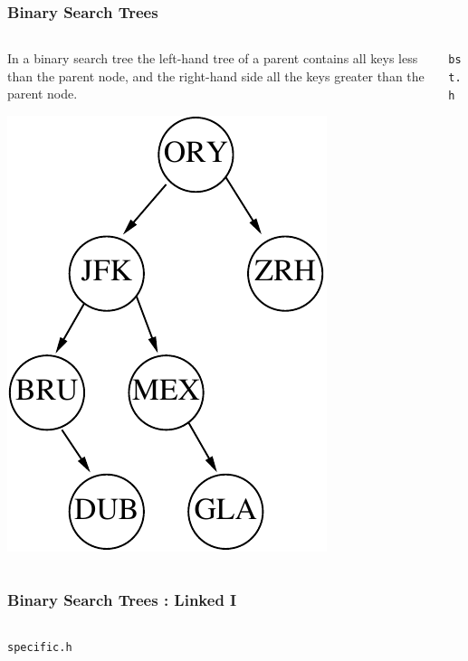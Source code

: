 \begin{frame}[fragile]
\frametitle{Binary Search Trees}
\begin{columns}[T]

\begin{column}{0.40\textwidth}
In a binary search tree the left-hand tree of a parent contains
all keys less than the parent node, and the right-hand side all
the keys greater than the parent node.	
\begin{center}	
\includegraphics[height=0.5\textheight]{../Images/treeapt.pdf}	
\end{center}	
\end{column}

\pause
\begin{column}{0.50\textwidth}
\verb^bst.h^

\end{column}

\end{columns}
\end{frame}


\begin{frame}[fragile]
\frametitle{Binary Search Trees : Linked I}
\begin{columns}[T]

\begin{column}{0.45\textwidth}
\verb^specific.h^

\end{column}

\pause
\begin{column}{0.45\textwidth}

\end{column}

\end{columns}
\end{frame}

